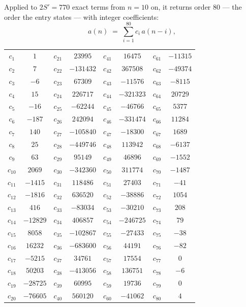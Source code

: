 \documentclass[11pt,a4paper]{article}
\theoremstyle{plain}
\theoremstyle{definition}
\begin{document}
Applied to $2S'=770$ exact terms from $n=10$ on, it returns order $80$ --- the
order the entry states --- with integer coefficients:
\[
a(n)\;=\;\sum_{i=1}^{80}c_i\,a(n-i),
\]
\begin{center}\small
\begin{tabular}{cccccccc}
$c_{1}$ & $1$ & $c_{21}$ & $23995$ & $c_{41}$ & $16475$ & $c_{61}$ & $-11315$ \\
$c_{2}$ & $7$ & $c_{22}$ & $-131432$ & $c_{42}$ & $367508$ & $c_{62}$ & $-49374$ \\
$c_{3}$ & $-6$ & $c_{23}$ & $67309$ & $c_{43}$ & $-11576$ & $c_{63}$ & $-8115$ \\
$c_{4}$ & $15$ & $c_{24}$ & $226717$ & $c_{44}$ & $-321323$ & $c_{64}$ & $20729$ \\
$c_{5}$ & $-16$ & $c_{25}$ & $-62244$ & $c_{45}$ & $-46766$ & $c_{65}$ & $5377$ \\
$c_{6}$ & $-187$ & $c_{26}$ & $242094$ & $c_{46}$ & $-331474$ & $c_{66}$ & $11284$ \\
$c_{7}$ & $140$ & $c_{27}$ & $-105840$ & $c_{47}$ & $-18300$ & $c_{67}$ & $1689$ \\
$c_{8}$ & $25$ & $c_{28}$ & $-449746$ & $c_{48}$ & $113942$ & $c_{68}$ & $-6137$ \\
$c_{9}$ & $63$ & $c_{29}$ & $95149$ & $c_{49}$ & $46896$ & $c_{69}$ & $-1552$ \\
$c_{10}$ & $2069$ & $c_{30}$ & $-342360$ & $c_{50}$ & $311774$ & $c_{70}$ & $-1487$ \\
$c_{11}$ & $-1415$ & $c_{31}$ & $118486$ & $c_{51}$ & $27403$ & $c_{71}$ & $-41$ \\
$c_{12}$ & $-1816$ & $c_{32}$ & $636520$ & $c_{52}$ & $-38886$ & $c_{72}$ & $1054$ \\
$c_{13}$ & $416$ & $c_{33}$ & $-83034$ & $c_{53}$ & $-30210$ & $c_{73}$ & $208$ \\
$c_{14}$ & $-12829$ & $c_{34}$ & $406857$ & $c_{54}$ & $-246725$ & $c_{74}$ & $79$ \\
$c_{15}$ & $8058$ & $c_{35}$ & $-102867$ & $c_{55}$ & $-27433$ & $c_{75}$ & $-38$ \\
$c_{16}$ & $16232$ & $c_{36}$ & $-683600$ & $c_{56}$ & $44191$ & $c_{76}$ & $-82$ \\
$c_{17}$ & $-5215$ & $c_{37}$ & $34761$ & $c_{57}$ & $17554$ & $c_{77}$ & $0$ \\
$c_{18}$ & $50203$ & $c_{38}$ & $-413056$ & $c_{58}$ & $136751$ & $c_{78}$ & $-6$ \\
$c_{19}$ & $-28725$ & $c_{39}$ & $60995$ & $c_{59}$ & $19736$ & $c_{79}$ & $0$ \\
$c_{20}$ & $-76605$ & $c_{40}$ & $560120$ & $c_{60}$ & $-41062$ & $c_{80}$ & $4$ \\
\end{tabular}
\end{center}
\end{document}
